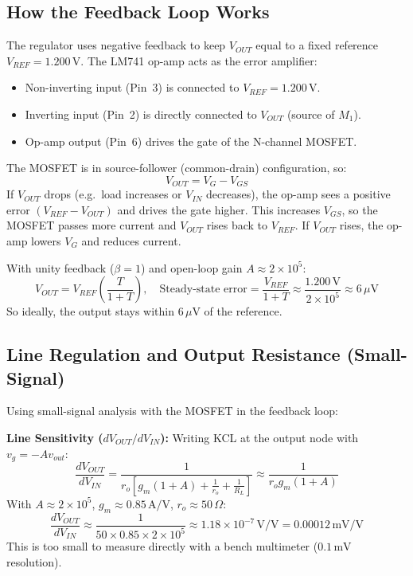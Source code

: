 \documentclass[11pt,a4paper]{article}
\begin{document}
\subsection{How the Feedback Loop Works}
The regulator uses negative feedback to keep $V_{OUT}$ equal to a fixed reference $V_{REF} = 1.200\,\text{V}$. The LM741 op-amp acts as the error amplifier:
\begin{itemize}[leftmargin=1.2em, itemsep=0.1em]
    \item Non-inverting input (Pin~3) is connected to $V_{REF} = 1.200\,\text{V}$.
    \item Inverting input (Pin~2) is directly connected to $V_{OUT}$ (source of $M_1$).
    \item Op-amp output (Pin~6) drives the gate of the N-channel MOSFET.
\end{itemize}
The MOSFET is in source-follower (common-drain) configuration, so:
\begin{equation}
    V_{OUT} = V_G - V_{GS}
\end{equation}
If $V_{OUT}$ drops (e.g.\ load increases or $V_{IN}$ decreases), the op-amp sees a positive error $(V_{REF} - V_{OUT})$ and drives the gate higher. This increases $V_{GS}$, so the MOSFET passes more current and $V_{OUT}$ rises back to $V_{REF}$. If $V_{OUT}$ rises, the op-amp lowers $V_G$ and reduces current.

With unity feedback ($\beta = 1$) and open-loop gain $A \approx 2 \times 10^5$:
\begin{equation}
    V_{OUT} = V_{REF} \left( \frac{T}{1 + T} \right), \quad \text{Steady-state error} = \frac{V_{REF}}{1 + T} \approx \frac{1.200\,\text{V}}{2 \times 10^5} \approx 6\,\mu\text{V}
\end{equation}
So ideally, the output stays within $6\,\mu\text{V}$ of the reference.

\subsection{Line Regulation and Output Resistance (Small-Signal)}
Using small-signal analysis with the MOSFET in the feedback loop:

\textbf{Line Sensitivity ($dV_{OUT}/dV_{IN}$):} Writing KCL at the output node with $v_g = -A v_{out}$:
\begin{equation}
    \frac{dV_{OUT}}{dV_{IN}} = \frac{1}{r_o \left[ g_m (1 + A) + \frac{1}{r_o} + \frac{1}{R_L} \right]} \approx \frac{1}{r_o g_m (1 + A)}
\end{equation}
With $A \approx 2 \times 10^5$, $g_m \approx 0.85\,\text{A/V}$, $r_o \approx 50\,\Omega$:
\begin{equation}
    \frac{dV_{OUT}}{dV_{IN}} \approx \frac{1}{50 \times 0.85 \times 2 \times 10^5} \approx 1.18 \times 10^{-7}\,\text{V/V} = 0.00012\,\text{mV/V}
\end{equation}
This is too small to measure directly with a bench multimeter ($0.1\,\text{mV}$ resolution).
\end{document}
